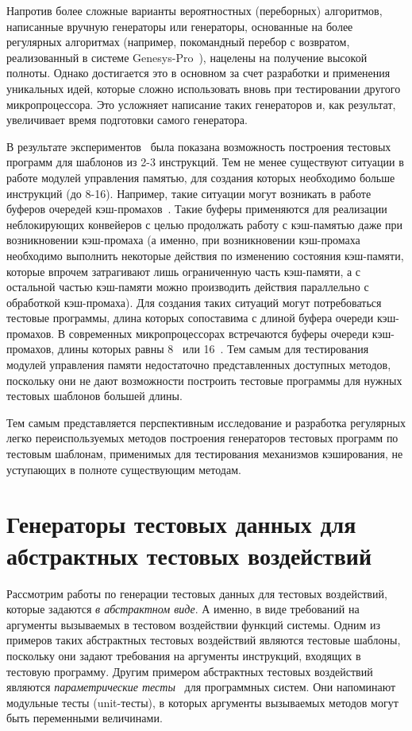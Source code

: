 Напротив более сложные варианты вероятностных (переборных)
алгоритмов, написанные вручную генераторы или генераторы, основанные
на более регулярных алгоритмах (например, покомандный перебор с
возвратом, реализованный в системе Genesys-Pro~\cite{GenesysPro}),
нацелены на получение высокой полноты. Однако достигается это в
основном за счет разработки и применения уникальных идей, которые
сложно использовать вновь при тестировании другого микропроцессора.
Это усложняет написание таких генераторов и, как результат,
увеличивает время подготовки самого генератора.

В результате экспериментов~\cite{vorobyev} была показана возможность
построения тестовых программ для шаблонов из 2-3 инструкций. Тем не
менее существуют ситуации в работе модулей управления памятью, для
создания которых необходимо больше инструкций (до 8-16). Например,
такие ситуации могут возникать в работе буферов очередей
кэш-промахов~\cite{HennesyPatterson}. Такие буферы применяются для
реализации неблокирующих конвейеров с целью продолжать работу с
кэш-памятью даже при возникновении кэш-промаха (а именно, при
возникновении кэш-промаха необходимо выполнить некоторые действия по
изменению состояния кэш-памяти, которые впрочем затрагивают лишь
ограниченную часть кэш-памяти, а с остальной частью кэш-памяти можно
производить действия параллельно с обработкой кэш-промаха). Для
создания таких ситуаций могут потребоваться тестовые программы,
длина которых сопоставима с длиной буфера очереди кэш-промахов. В
современных микропроцессорах встречаются буферы очереди
кэш-промахов, длины которых равны 8~\cite{Alpha21264} или
16~\cite{Alpha21364, Cell}. Тем самым для тестирования модулей
управления памяти недостаточно представленных доступных методов,
поскольку они не дают возможности построить тестовые программы для
нужных тестовых шаблонов большей длины.

Тем самым представляется перспективным исследование и разработка
регулярных легко переиспользуемых методов построения генераторов
тестовых программ по тестовым шаблонам, применимых для тестирования
механизмов кэширования, не уступающих в полноте существующим
методам.

\section{Генераторы тестовых данных для абстрактных тестовых
воздействий}

Рассмотрим работы по генерации тестовых данных для тестовых
воздействий, которые задаются \emph{в абстрактном виде}. А именно, в
виде требований на аргументы вызываемых в тестовом воздействии
функций системы. Одним из примеров таких абстрактных тестовых
воздействий являются тестовые шаблоны, поскольку они задают
требования на аргументы инструкций, входящих в тестовую программу.
Другим примером абстрактных тестовых воздействий являются
\emph{параметрические тесты}~\cite{Pex} для программных систем. Они
напоминают модульные тесты (unit-тесты), в которых аргументы
вызываемых методов могут быть переменными величинами.

